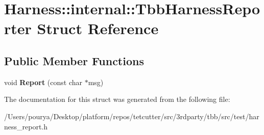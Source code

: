 \hypertarget{structHarness_1_1internal_1_1TbbHarnessReporter}{}\section{Harness\+:\+:internal\+:\+:Tbb\+Harness\+Reporter Struct Reference}
\label{structHarness_1_1internal_1_1TbbHarnessReporter}
\subsection*{Public Member Functions}
\begin{DoxyCompactItemize}
\item 
\hypertarget{structHarness_1_1internal_1_1TbbHarnessReporter_ad48c3a0cc6108332727ae115c3e63dbe}{}void {\bfseries Report} (const char $\ast$msg)\label{structHarness_1_1internal_1_1TbbHarnessReporter_ad48c3a0cc6108332727ae115c3e63dbe}

\end{DoxyCompactItemize}


The documentation for this struct was generated from the following file\+:\begin{DoxyCompactItemize}
\item 
/\+Users/pourya/\+Desktop/platform/repos/tetcutter/src/3rdparty/tbb/src/test/harness\+\_\+report.\+h\end{DoxyCompactItemize}

